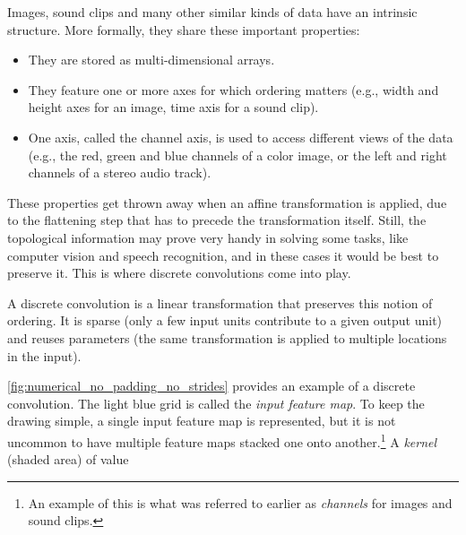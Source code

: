 \documentclass[notitlepage]{report}
\begin{document}
Images, sound clips and many other similar kinds of data have an intrinsic
structure. More formally, they share these important properties:

\begin{itemize}
    \item They are stored as multi-dimensional arrays.
    \item They feature one or more axes for which ordering matters (e.g., width
        and height axes for an image, time axis for a sound clip).
    \item One axis, called the channel axis, is used to access different views
        of the data (e.g., the red, green and blue channels of a color image, or
        the left and right channels of a stereo audio track).
\end{itemize}

These properties get thrown away when an affine transformation is applied, due
to the flattening step that has to precede the transformation itself. Still, the
topological information may prove very handy in solving some tasks, like
computer vision and speech recognition, and in these cases it would be best to
preserve it. This is where discrete convolutions come into play.

A discrete convolution is a linear transformation that preserves this notion of
ordering. It is sparse (only a few input units contribute to a given output
unit) and reuses parameters (the same transformation is applied to multiple
locations in the input).

\autoref{fig:numerical_no_padding_no_strides} provides an example of a discrete
convolution. The light blue grid is called the {\em input feature map}. To keep
the drawing simple, a single input feature map is represented, but it is not
uncommon to have multiple feature maps stacked one onto another.\footnote{%
    An example of this is what was referred to earlier as {\em channels} for
    images and sound clips.}
A {\em kernel} (shaded area) of value

\begin{figure}[h]
    \centering
\end{figure}
\end{document}
